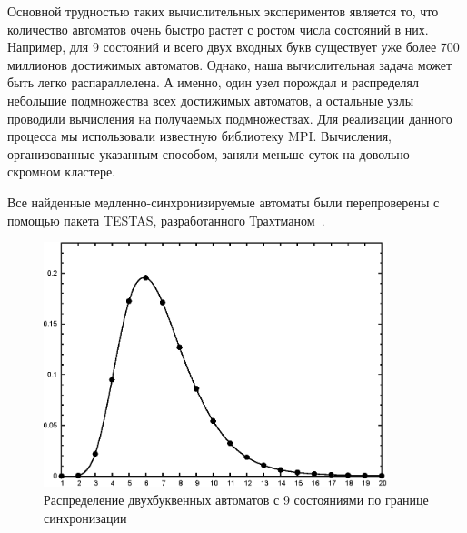 \documentclass[11pt]{article}
\begin{document}
Основной трудностью таких вычислительных экспериментов является то, что количество
автоматов очень быстро растет с ростом числа состояний в них. Например, для 9 состояний
и всего двух входных букв существует уже более 700 миллионов достижимых автоматов.
Однако, наша вычислительная задача может быть легко распараллелена. А именно,
один узел порождал и распределял небольшие подмножества всех достижимых автоматов, а остальные
узлы проводили вычисления на получаемых подмножествах. Для реализации данного процесса
мы использовали известную библиотеку MPI. Вычисления, организованные указанным способом,
заняли меньше суток на довольно скромном кластере.



Все найденные медленно-синхронизируемые автоматы были перепроверены с помощью
пакета TESTAS, разработанного Трахтманом~\cite{Tr06}.



\begin{figure}[h]
\begin{center}
\includegraphics[width=10cm]{stat.eps}
\caption{Распределение двухбуквенных автоматов с 9 состояниями по границе синхронизации}
\label{fig:stat}
\end{center}
\end{figure}
\end{document}
